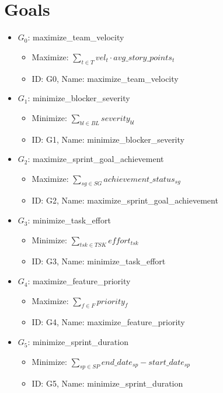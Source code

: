 \documentclass{article}
\begin{document}
\section{Goals}
\begin{itemize}
    \item $G_0$: maximize\_team\_velocity
        \begin{itemize}
            \item Maximize: $\sum_{t \in T} vel_t \cdot avg\_story\_points_t$
            \item ID: G0, Name: maximize\_team\_velocity
        \end{itemize}
    \item $G_1$: minimize\_blocker\_severity
        \begin{itemize}
            \item Minimize: $\sum_{bl \in BL} severity_{bl}$
            \item ID: G1, Name: minimize\_blocker\_severity
        \end{itemize}
    \item $G_2$: maximize\_sprint\_goal\_achievement
        \begin{itemize}
            \item Maximize: $\sum_{sg \in SG} achievement\_status_{sg}$
            \item ID: G2, Name: maximize\_sprint\_goal\_achievement
        \end{itemize}
    \item $G_3$: minimize\_task\_effort
        \begin{itemize}
            \item Minimize: $\sum_{tsk \in TSK} effort_{tsk}$
            \item ID: G3, Name: minimize\_task\_effort
        \end{itemize}
    \item $G_4$: maximize\_feature\_priority
        \begin{itemize}
            \item Maximize: $\sum_{f \in F} priority_f$
            \item ID: G4, Name: maximize\_feature\_priority
        \end{itemize}
    \item $G_5$: minimize\_sprint\_duration
        \begin{itemize}
            \item Minimize: $\sum_{sp \in SP} end\_date_{sp} - start\_date_{sp}$
            \item ID: G5, Name: minimize\_sprint\_duration

\end{itemize}
\end{itemize}
\end{document}
